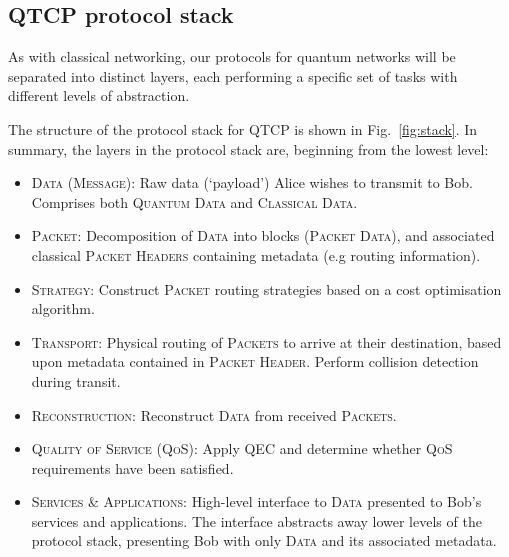%
%

\subsection{QTCP protocol stack} \label{sec:prot_stack} 

As with classical networking, our protocols for quantum networks will be separated into distinct layers, each performing a specific set of tasks with different levels of abstraction.

The structure of the protocol stack for QTCP is shown in Fig.~\ref{fig:stack}. In summary, the layers in the protocol stack are, beginning from the lowest level:
\begin{itemize}
\item \textsc{Data (Message)}: Raw data (`payload') Alice wishes to transmit to Bob. Comprises both \textsc{Quantum Data} and \textsc{Classical Data}.
\item \textsc{Packet}: Decomposition of \textsc{Data} into blocks (\textsc{Packet Data}), and associated classical \textsc{Packet Headers} containing metadata (e.g routing information).
\item \textsc{Strategy}: Construct \textsc{Packet} routing strategies based on a cost optimisation algorithm.
\item \textsc{Transport}: Physical routing of \textsc{Packets} to arrive at their destination, based upon metadata contained in \textsc{Packet Header}. Perform collision detection during transit.
\item \textsc{Reconstruction}: Reconstruct \textsc{Data} from received \textsc{Packets}.
\item \textsc{Quality of Service (QoS)}: Apply QEC and determine whether \textsc{QoS} requirements have been satisfied.
\item \textsc{Services \& Applications}: High-level interface to \textsc{Data} presented to Bob's services and applications. The interface abstracts away lower levels of the protocol stack, presenting Bob with only \textsc{Data} and its associated metadata.
\end{itemize}

